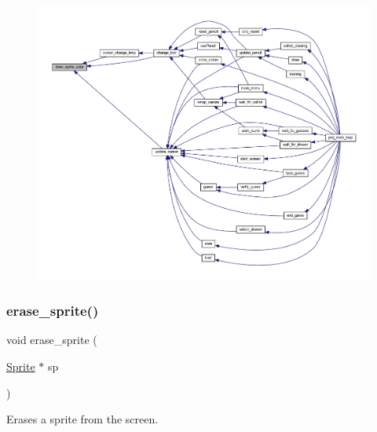 \begin{figure}[H]
\begin{center}
\leavevmode
\includegraphics[width=350pt]{group__sprite_gab5aa8ee6efdb9ebf62df81cad24c445c_icgraph}
\end{center}
\end{figure}
\mbox{\label{group__sprite_ga9c7e23b48dc8ea0f565655744cbae06c}} 
\subsubsection{\texorpdfstring{erase\+\_\+sprite()}{erase\_sprite()}}
{\footnotesize\ttfamily void erase\+\_\+sprite (\begin{DoxyParamCaption}\item[{\mbox{\hyperlink{struct_sprite}{Sprite}} $\ast$}]{sp }\end{DoxyParamCaption})}



Erases a sprite from the screen. 



